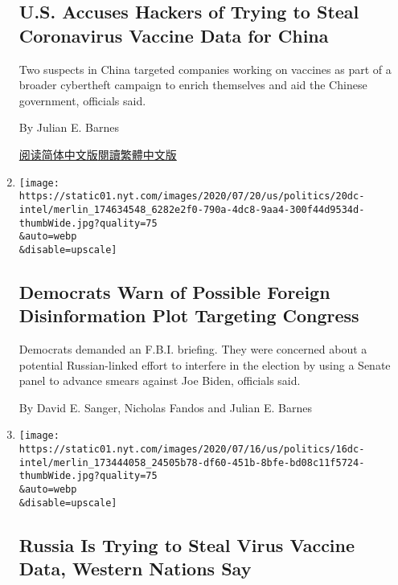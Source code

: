 \begin{enumerate}
{  \subsection{U.S. Accuses Hackers of Trying to Steal Coronavirus
  Vaccine Data for
  China}\label{us-accuses-hackers-of-trying-to-steal-coronavirus-vaccine-data-for-china}}

  Two suspects in China targeted companies working on vaccines as part
  of a broader cybertheft campaign to enrich themselves and aid the
  Chinese government, officials said.

  By Julian E. Barnes

  \href{https://cn.nytimes.com/usa/20200722/china-hacking-coronavirus-vaccine/}{阅读简体中文版}\href{https://cn.nytimes.com/usa/20200722/china-hacking-coronavirus-vaccine/zh-hant/}{閱讀繁體中文版}
\item
  \href{/2020/07/20/us/politics/congress-disinformation-biden-russia-ukraine.html}{}

  \texttt{[image: https://static01.nyt.com/images/2020/07/20/us/politics/20dc-intel/merlin\_174634548\_6282e2f0-790a-4dc8-9aa4-300f44d9534d-thumbWide.jpg?quality=75\\\&auto=webp\\\&disable=upscale]}

  \hypertarget{democrats-warn-of-possible-foreign-disinformation-plot-targeting-congress}{%
  \subsection{Democrats Warn of Possible Foreign Disinformation Plot
  Targeting
  Congress}\label{democrats-warn-of-possible-foreign-disinformation-plot-targeting-congress}}

  Democrats demanded an F.B.I. briefing. They were concerned about a
  potential Russian-linked effort to interfere in the election by using
  a Senate panel to advance smears against Joe Biden, officials said.

  By David E. Sanger, Nicholas Fandos and Julian E. Barnes
\item
  \href{/2020/07/16/us/politics/vaccine-hacking-russia.html}{}

  \texttt{[image: https://static01.nyt.com/images/2020/07/16/us/politics/16dc-intel/merlin\_173444058\_24505b78-df60-451b-8bfe-bd08c11f5724-thumbWide.jpg?quality=75\\\&auto=webp\\\&disable=upscale]}

  \hypertarget{russia-is-trying-to-steal-virus-vaccine-data-western-nations-say}{%
  \subsection{Russia Is Trying to Steal Virus Vaccine Data, Western
  Nations
  Say}\label{russia-is-trying-to-steal-virus-vaccine-data-western-nations-say}}


\end{enumerate}
